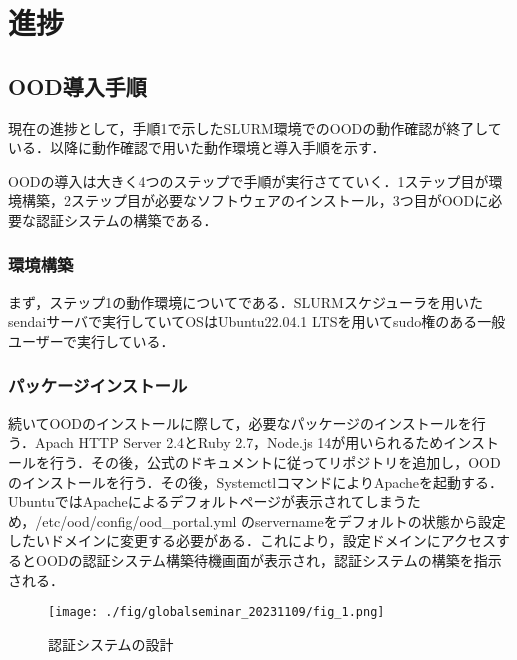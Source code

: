 \documentclass[a4paper,oneside,twocolumn,notitlepage,dvipdfmx]{jsarticle}
\begin{document}
\section{進捗}

\subsection{OOD導入手順}
現在の進捗として，手順1で示したSLURM環境でのOODの動作確認が終了している．以降に動作確認で用いた動作環境と導入手順を示す．\par
OODの導入は大きく4つのステップで手順が実行さてていく．1ステップ目が環境構築，2ステップ目が必要なソフトウェアのインストール，3つ目がOODに必要な認証システムの構築である．\par

\subsubsection{環境構築}
まず，ステップ1の動作環境についてである．SLURMスケジューラを用いたsendaiサーバで実行していてOSはUbuntu22.04.1 LTSを用いてsudo権のある一般ユーザーで実行している．\par

\subsubsection{パッケージインストール}
続いてOODのインストールに際して，必要なパッケージのインストールを行う．Apach HTTP Server 2.4とRuby 2.7，Node.js 14が用いられるためインストールを行う．その後，公式のドキュメントに従ってリポジトリを追加し，OODのインストールを行う．その後，SystemctlコマンドによりApacheを起動する．UbuntuではApacheによるデフォルトページが表示されてしまうため，/etc/ood/config/ood\_portal.yml のservernameをデフォルトの状態から設定したいドメインに変更する必要がある．これにより，設定ドメインにアクセスするとOODの認証システム構築待機画面が表示され，認証システムの構築を指示される．\par

\begin{figure}[h]
  \centering
  \texttt{[image: ./fig/globalseminar\_20231109/fig\_1.png]}
  \caption{認証システムの設計}
  \label{fig_1}
\end{figure}
\end{document}

